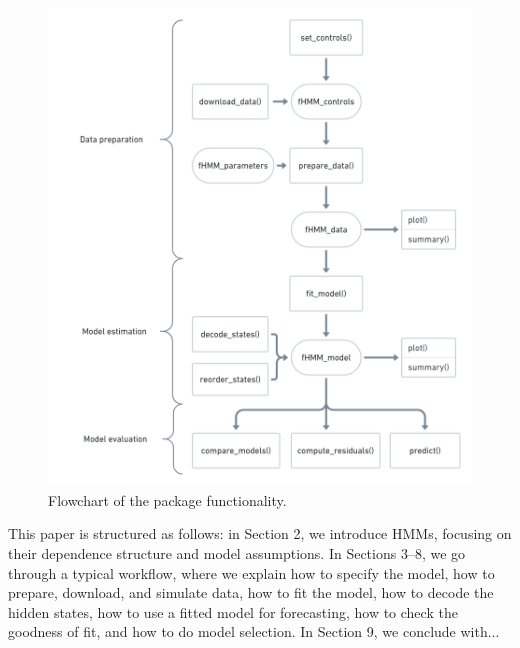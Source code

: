 \documentclass[article]{jss}
\begin{document}
\begin{figure}[t!]
  \centering
  \includegraphics[scale = 0.4]{flowchart.png}
  \caption{Flowchart of the package functionality.}
  \label{fig:flowchart}
\end{figure}

This paper is structured as follows: in Section 2, we introduce HMMs, focusing on their dependence structure and model assumptions. In Sections 3--8, we go through a typical workflow, where we explain how to specify the model, how to prepare, download, and simulate data, how to fit the model, how to decode the hidden states, how to use a fitted model for forecasting, how to check the goodness of fit, and how to do model selection. In Section 9, we conclude with...

\end{document}
